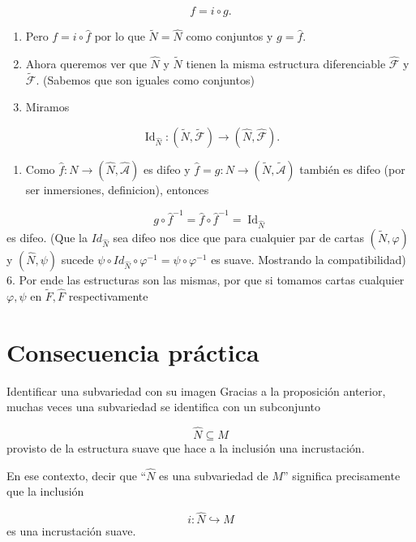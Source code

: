 \begin{bookproof}{}
\[
f=i\circ g.
\]
\begin{enumerate}[start=2]
\item Pero $f=i\circ\widehat f$  por lo que $\widetilde N=\widehat N$ como conjuntos y  $g=\widehat f$.
\item Ahora queremos ver que $\widehat{N}$ y $\widetilde{N}$ tienen la misma estructura diferenciable $\widehat{\mathcal{F}}$ y $\widetilde{\mathcal{F}}$. (Sabemos que son iguales como conjuntos)
\item Miramos
\end{enumerate}
\[
\operatorname{Id}_{\widehat N}:(\widetilde N,\widetilde{\mathcal F})\to(\widehat N,\widehat{\mathcal F}).
\]
\begin{enumerate}[start=5]
\item Como $\widehat f:N\to(\widehat N,\widehat{\mathcal A})$ es difeo y $\widehat f=g:N\to(\widetilde N,\widetilde{\mathcal A})$ también es difeo (por ser inmersiones, definicion), entonces
\end{enumerate}
\[
g\circ\widehat f^{-1}=\widehat f\circ\widehat f^{-1}=\operatorname{Id}_{\widehat N}
\]
es difeo. (Que la $Id_{\widehat{N}}$ sea difeo nos dice que para cualquier par de cartas $(\widetilde{N},\varphi)$ y $(\widehat{N},\psi)$ sucede $\psi\circ Id_{\widehat{N}}\circ\varphi ^{-1}=\psi\circ\varphi ^{-1}$ es suave. Mostrando la compatibilidad) 6. Por ende las estructuras son las mismas, por que si tomamos cartas cualquier $\varphi,\psi$ en $\widetilde{F},\widehat{F}$ respectivamente

\bookqed
\end{bookproof}
\section{Consecuencia práctica}
\begin{bookremark}{Identificar una subvariedad con su imagen}
Gracias a la proposición anterior, muchas veces una subvariedad se identifica con un subconjunto

\[
\widehat N\subseteq M
\]
provisto de la estructura suave que hace a la inclusión una incrustación.

En ese contexto, decir que “$\widehat N$ es una subvariedad de $M$” significa precisamente que la inclusión

\[
i:\widehat N\hookrightarrow M
\]
es una incrustación suave.

\end{bookremark}
